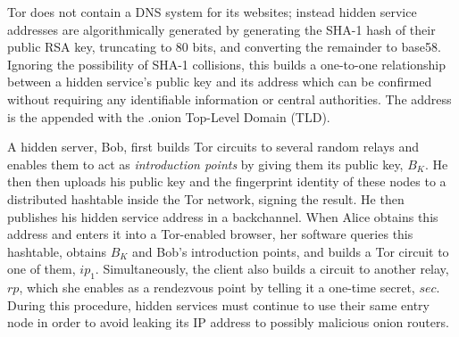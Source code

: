 Tor does not contain a DNS system for its websites; instead hidden service addresses are algorithmically generated by generating the SHA-1 hash of their public RSA key, truncating to 80 bits, and converting the remainder to base58. Ignoring the possibility of SHA-1 collisions, this builds a one-to-one relationship between a hidden service's public key and its address which can be confirmed without requiring any identifiable information or central authorities. The address is the appended with the .onion Top-Level Domain (TLD).

A hidden server, Bob, first builds Tor circuits to several random relays and enables them to act as \textit{introduction points} by giving them its public key, $ B_{K} $. He then then uploads his public key and the fingerprint identity of these nodes to a distributed hashtable inside the Tor network, signing the result. He then publishes his hidden service address in a backchannel. When Alice obtains this address and enters it into a Tor-enabled browser, her software queries this hashtable, obtains $ B_{K} $ and Bob's introduction points, and builds a Tor circuit to one of them, $ ip_{1} $. Simultaneously, the client also builds a circuit to another relay, $ rp $, which she enables as a rendezvous point by telling it a one-time secret, $ sec $. During this procedure, hidden services must continue to use their same entry node in order to avoid leaking its IP address to possibly malicious onion routers.\cite{bauer2007low}\cite{overlier2006locating}

